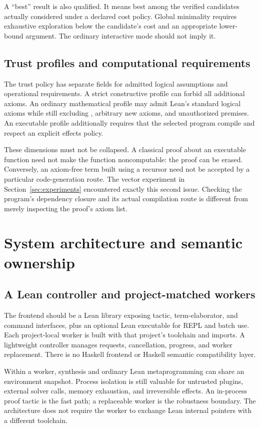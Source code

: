 A ``best'' result is also qualified. It means best among the verified candidates actually considered under a declared cost policy. Global minimality requires exhaustive exploration below the candidate's cost and an appropriate lower-bound argument. The ordinary interactive mode should not imply it.

\subsection{Trust profiles and computational requirements}
The trust policy has separate fields for admitted logical assumptions and operational requirements. A strict constructive profile can forbid all additional axioms. An ordinary mathematical profile may admit Lean's standard logical axioms while still excluding , arbitrary new axioms, and unauthorized premises. An executable profile additionally requires that the selected program compile and respect an explicit effects policy.

These dimensions must not be collapsed. A classical proof about an executable function need not make the function noncomputable: the proof can be erased. Conversely, an axiom-free term built using a recursor need not be accepted by a particular code-generation route. The vector experiment in Section~\ref{sec:experiments} encountered exactly this second issue. Checking the program's dependency closure and its actual compilation route is different from merely inspecting the proof's axiom list.

\section{System architecture and semantic ownership}
\label{sec:architecture}
\subsection{A Lean controller and project-matched workers}
The frontend should be a Lean library exposing tactic, term-elaborator, and command interfaces, plus an optional Lean executable for REPL and batch use. Each project-local worker is built with that project's toolchain and imports. A lightweight controller manages requests, cancellation, progress, and worker replacement. There is no Haskell frontend or Haskell semantic compatibility layer.

Within a worker, synthesis and ordinary Lean metaprogramming can share an environment snapshot. Process isolation is still valuable for untrusted plugins, external solver calls, memory exhaustion, and irreversible effects. An in-process proof tactic is the fast path; a replaceable worker is the robustness boundary. The architecture does not require the worker to exchange Lean internal pointers with a different toolchain.

